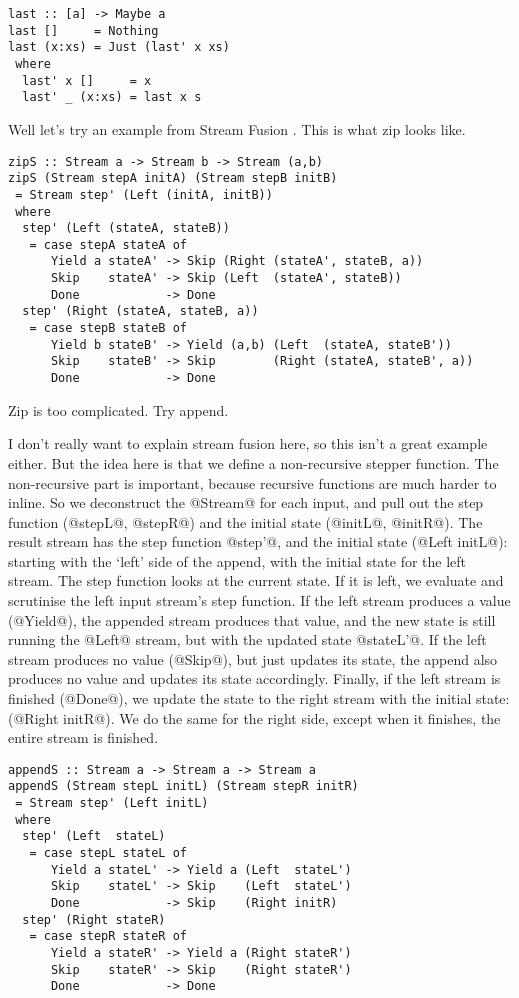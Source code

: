 \begin{lstlisting}
last :: [a] -> Maybe a
last []     = Nothing
last (x:xs) = Just (last' x xs)
 where
  last' x []     = x
  last' _ (x:xs) = last x s
\end{lstlisting}

Well let's try an example from Stream Fusion \cite{coutts2007stream}.
This is what zip looks like.

\begin{lstlisting}
zipS :: Stream a -> Stream b -> Stream (a,b)
zipS (Stream stepA initA) (Stream stepB initB)
 = Stream step' (Left (initA, initB))
 where
  step' (Left (stateA, stateB))
   = case stepA stateA of
      Yield a stateA' -> Skip (Right (stateA', stateB, a))
      Skip    stateA' -> Skip (Left  (stateA', stateB))
      Done            -> Done
  step' (Right (stateA, stateB, a))
   = case stepB stateB of
      Yield b stateB' -> Yield (a,b) (Left  (stateA, stateB'))
      Skip    stateB' -> Skip        (Right (stateA, stateB', a))
      Done            -> Done
\end{lstlisting}

Zip is too complicated. Try append.

I don't really want to explain stream fusion here, so this isn't a great example either.
But the idea here is that we define a non-recursive stepper function. The non-recursive part is important, because recursive functions are much harder to inline.
So we deconstruct the @Stream@ for each input, and pull out the step function (@stepL@, @stepR@) and the initial state (@initL@, @initR@).
The result stream has the step function @step'@, and the initial state (@Left initL@): starting with the `left' side of the append, with the initial state for the left stream.
The step function looks at the current state.
If it is left, we evaluate and scrutinise the left input stream's step function.
If the left stream produces a value (@Yield@), the appended stream produces that value, and the new state is still running the @Left@ stream, but with the updated state @stateL'@.
If the left stream produces no value (@Skip@), but just updates its state, the append also produces no value and updates its state accordingly.
Finally, if the left stream is finished (@Done@), we update the state to the right stream with the initial state: (@Right initR@).
We do the same for the right side, except when it finishes, the entire stream is finished.

\begin{lstlisting}
appendS :: Stream a -> Stream a -> Stream a
appendS (Stream stepL initL) (Stream stepR initR)
 = Stream step' (Left initL)
 where
  step' (Left  stateL)
   = case stepL stateL of
      Yield a stateL' -> Yield a (Left  stateL')
      Skip    stateL' -> Skip    (Left  stateL')
      Done            -> Skip    (Right initR)
  step' (Right stateR)
   = case stepR stateR of
      Yield a stateR' -> Yield a (Right stateR')
      Skip    stateR' -> Skip    (Right stateR')
      Done            -> Done
\end{lstlisting}


